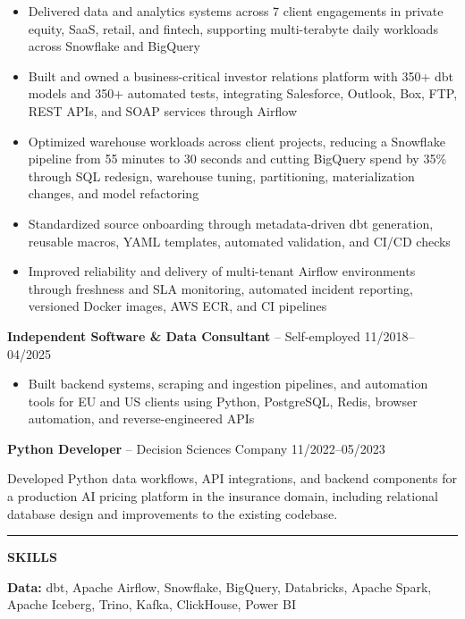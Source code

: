 \documentclass[11pt,a4paper]{article}
\newcommand{\sectionline}[1]{%
  \par\vspace{1pt}%
  \noindent\rule{\textwidth}{0.5pt}\par%
  \vspace{0pt}%
  \noindent\textbf{#1}\par%
}
\begin{document}
\begin{itemize}
\item Delivered data and analytics systems across 7 client engagements in private equity, SaaS, retail, and fintech, supporting multi-terabyte daily workloads across Snowflake and BigQuery

\item Built and owned a business-critical investor relations platform with 350+ dbt models and 350+ automated tests, integrating Salesforce, Outlook, Box, FTP, REST APIs, and SOAP services through Airflow

\item Optimized warehouse workloads across client projects, reducing a Snowflake pipeline from 55 minutes to 30 seconds and cutting BigQuery spend by 35\% through SQL redesign, warehouse tuning, partitioning, materialization changes, and model refactoring

\item Standardized source onboarding through metadata-driven dbt generation, reusable macros, YAML templates, automated validation, and CI/CD checks

\item Improved reliability and delivery of multi-tenant Airflow environments through freshness and SLA monitoring, automated incident reporting, versioned Docker images, AWS ECR, and CI pipelines
\end{itemize}

\textbf{Independent Software \& Data Consultant} -- Self-employed
\hfill 11/2018--04/2025

\begin{itemize}
\item Built backend systems, scraping and ingestion pipelines, and automation tools for EU and US clients using Python, PostgreSQL, Redis, browser automation, and reverse-engineered APIs
\end{itemize}

\textbf{Python Developer} -- Decision Sciences Company
\hfill 11/2022--05/2023

Developed Python data workflows, API integrations, and backend components for a production AI pricing platform in the insurance domain, including relational database design and improvements to the existing codebase.

\sectionline{SKILLS}

\textbf{Data:}
dbt, Apache Airflow, Snowflake, BigQuery, Databricks, Apache Spark, Apache Iceberg, Trino, Kafka, ClickHouse, Power BI
\end{document}
